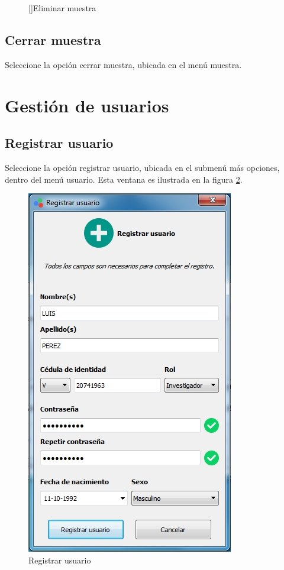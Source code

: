 \begin{figure}[H]
\begin{minipage}{.5\textwidth}
  []{Eliminar muestra}
  \label{fig:eliminar-muestra}
\end{minipage}
\end{figure}

	\subsection*{Cerrar muestra}
	
	Seleccione la opci\'{o}n cerrar muestra, ubicada en el men\'{u} muestra.

\newpage

\section*{Gesti\'{o}n de usuarios}

	\subsection*{Registrar usuario}
	
	Seleccione la opci\'{o}n registrar usuario, ubicada en el submen\'{u} m\'{a}s opciones, dentro del men\'{u} usuario. Esta ventana es ilustrada en la figura \ref{fig:registrar-usuario}.
\vfill
\begin{figure}[H]
  \centering
  \includegraphics[width=.6\linewidth]{./img/registrar-usuario.jpg}
\caption[]{Registrar usuario\label{fig:registrar-usuario}}
\end{figure}
\vfill
